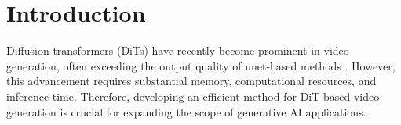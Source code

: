 \section{Introduction}
\label{sec:intro}
Diffusion transformers (DiTs) \cite{Peebles2022DiT,yuan2024ditfastattn} have recently become prominent in video generation, often exceeding the output quality of unet-based methods \cite{ho2020denoising,rombach2022high,blattmann2023stable}. However, this advancement requires substantial memory, computational resources, and inference time. Therefore, developing an efficient method for DiT-based video generation is crucial for expanding the scope of generative AI applications.



